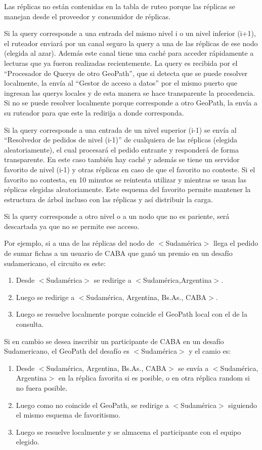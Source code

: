 Las réplicas no están contenidas en la tabla de ruteo porque las réplicas se manejan desde el proveedor y consumidor de réplicas.

Si la query corresponde a una entrada del mismo nivel i o un nivel inferior (i+1), el ruteador enviará por un canal seguro la query a una de las réplicas de ese nodo (elegida al azar). Además este canal tiene una caché para acceder rápidamente a lecturas que ya fueron realizadas recientemente. La query es recibida por el “Procesador de Querys de otro GeoPath”, que si detecta que se puede resolver localmente, la envía al “Gestor de acceso a datos” por el mismo puerto que ingresan las querys locales y de esta manera se hace transparente la procedencia. Si no se puede resolver localmente porque corresponde a otro GeoPath, la envía a su ruteador para que este la redirija a donde corresponda.

Si la query corresponde a una entrada de un nivel superior (i-1) se envía al “Resolvedor de pedidos de nivel (i-1)” de cualquiera de las réplicas (elegida aleatoriamente), el cual procesará el pedido entrante y responderá de forma transparente. En este caso también hay caché y además se tiene un servidor favorito de nivel (i-1) y otras réplicas en caso de que el favorito no conteste. Si el favorito no contesta, en 10 minutos se reintenta utilizar y mientras se usan las réplicas elegidas aleatoriamente. Este esquema del favorito permite mantener la estructura de árbol incluso con las réplicas y así distribuir la carga.

Si la query corresponde a otro nivel o a un nodo que no es pariente, será descartada ya que no se permite ese acceso.

Por ejemplo, si a una de las réplicas del nodo de $<$Sudamérica$>$ llega el pedido de sumar fichas a un usuario de CABA que ganó un premio en un desafío sudamericano, el circuito es este:
\begin{enumerate}
	\item Desde $<$Sudamérica$>$ se redirige a $<$Sudamérica,Argentina$>$.
	\item Luego se redirige a $<$Sudamérica, Argentina, Bs.As., CABA$>$.
	\item Luego se resuelve localmente porque coincide el GeoPath local con el de la consulta.
\end{enumerate}

Si en cambio se desea inscribir un participante de CABA en un desafío Sudamericano, el GeoPath del desafío es $<$Sudamérica$>$ y el camio es:
\begin{enumerate}
	\item Desde $<$Sudamérica, Argentina, Bs.As., CABA$>$ se envía a $<$Sudamérica, Argentina$>$ en la réplica favorita si es posible, o en otra réplica random si no fuera posible.
	\item Luego como no coincide el GeoPath, se redirige a $<$Sudamérica$>$ siguiendo el mismo esquema de favoritismo.
	\item Luego se resuelve localmente y se almacena el participante con el equipo elegido.
\end{enumerate}


